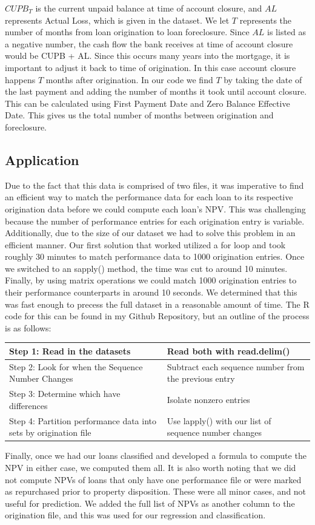 \documentclass[12 pt]{uncw_thesis}
\theoremstyle{plain}
\theoremstyle{remark}
\theoremstyle{definition}
\begin{document}
 $CUPB_T$ is the current unpaid balance at time of account closure, and $AL$ represents Actual Loss,  which is given in the dataset. We let $T$ represents the number of months from loan origination to loan  foreclosure. Since $AL$ is listed as a negative number, the cash flow the bank receives at time of account closure would be CUPB + AL. Since this occurs many years into the mortgage, it is important to adjust it back to time of origination. In this case account closure happens \(T\) months after origination. In our code we find $T$ by taking the date of the last payment and adding the number of months it took until account closure. This can be calculated using First Payment Date and Zero Balance Effective Date. This gives us the total number of months between origination and foreclosure. 
\subsection{Application}
Due to the fact that this data is comprised of two files, it was imperative to find an efficient way to match the performance data for each loan to its respective origination data before we could compute each loan's NPV. This was challenging because the number of performance entries for each origination entry is variable. Additionally, due to the size of our dataset we had to solve this problem in an efficient manner. Our first solution that worked utilized a for loop and took roughly 30 minutes to match performance data to 1000 origination entries. Once we switched to an sapply() method, the time was cut to around 10 minutes. Finally, by using matrix operations we could match 1000 origination entries to their performance counterparts in around 10 seconds. We determined that this was fast enough to precess the full dataset in a reasonable amount of time. The R code for this can be found in my Github Repository, but an outline of the process is as follows:
\begin{center}
	\begin{tabular}{|M{6cm}|M{8cm}|} 
		\hline
		Step 1: Read in the datasets & Read both with read.delim()\\ 
		\hline
		Step 2: Look for when the Sequence Number Changes& Subtract each sequence number from the previous entry\\
		\hline
		Step 3: Determine which have differences & Isolate nonzero entries \\
		\hline
		Step 4: Partition performance data into sets by origination file & Use lapply() with our list of sequence number changes\\
		\hline
	\end{tabular}
\end{center}
Finally, once we had our loans classified and developed a formula to compute the NPV in either case, we computed them all. It is also worth noting that we did not compute NPVs of loans that only have one performance file or were marked as repurchased prior to property disposition. These were all minor cases, and not useful for prediction. We added the full list of NPVs as another column to the origination file, and this was used for our regression and classification. 
\end{document}
